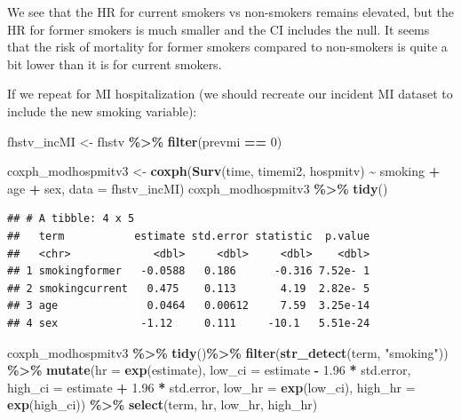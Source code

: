 \documentclass[
]{book}
\newenvironment{Shaded}{\begin{snugshade}}{\end{snugshade}}
\newcommand{\AttributeTok}[1]{\textcolor[rgb]{0.13,0.29,0.53}{#1}}
\newcommand{\DecValTok}[1]{\textcolor[rgb]{0.00,0.00,0.81}{#1}}
\newcommand{\FloatTok}[1]{\textcolor[rgb]{0.00,0.00,0.81}{#1}}
\newcommand{\FunctionTok}[1]{\textcolor[rgb]{0.13,0.29,0.53}{\textbf{#1}}}
\newcommand{\NormalTok}[1]{#1}
\newcommand{\OtherTok}[1]{\textcolor[rgb]{0.56,0.35,0.01}{#1}}
\newcommand{\SpecialCharTok}[1]{\textcolor[rgb]{0.81,0.36,0.00}{\textbf{#1}}}
\newcommand{\StringTok}[1]{\textcolor[rgb]{0.31,0.60,0.02}{#1}}
\begin{document}
We see that the HR for current smokers vs non-smokers remains elevated, but the HR for former smokers is much smaller and the CI includes the null. It seems that the risk of mortality for former smokers compared to non-smokers is quite a bit lower than it is for current smokers.

If we repeat for MI hospitalization (we should recreate our incident MI dataset to include the new smoking variable):

\begin{Shaded}
\begin{Highlighting}[]
\NormalTok{fhstv\_incMI }\OtherTok{\textless{}{-}}\NormalTok{ fhstv }\SpecialCharTok{\%\textgreater{}\%}
  \FunctionTok{filter}\NormalTok{(prevmi }\SpecialCharTok{==} \DecValTok{0}\NormalTok{) }

\NormalTok{coxph\_modhospmitv3 }\OtherTok{\textless{}{-}} \FunctionTok{coxph}\NormalTok{(}\FunctionTok{Surv}\NormalTok{(time, timemi2, hospmitv) }\SpecialCharTok{\textasciitilde{}} 
\NormalTok{                              smoking }\SpecialCharTok{+}\NormalTok{ age }\SpecialCharTok{+}\NormalTok{ sex, }
                            \AttributeTok{data =}\NormalTok{ fhstv\_incMI)}
\NormalTok{coxph\_modhospmitv3 }\SpecialCharTok{\%\textgreater{}\%}
  \FunctionTok{tidy}\NormalTok{()}
\end{Highlighting}
\end{Shaded}

\begin{verbatim}
## # A tibble: 4 x 5
##   term           estimate std.error statistic  p.value
##   <chr>             <dbl>     <dbl>     <dbl>    <dbl>
## 1 smokingformer   -0.0588   0.186      -0.316 7.52e- 1
## 2 smokingcurrent   0.475    0.113       4.19  2.82e- 5
## 3 age              0.0464   0.00612     7.59  3.25e-14
## 4 sex             -1.12     0.111     -10.1   5.51e-24
\end{verbatim}

\begin{Shaded}
\begin{Highlighting}[]
\NormalTok{coxph\_modhospmitv3 }\SpecialCharTok{\%\textgreater{}\%} 
  \FunctionTok{tidy}\NormalTok{()}\SpecialCharTok{\%\textgreater{}\%} 
  \FunctionTok{filter}\NormalTok{(}\FunctionTok{str\_detect}\NormalTok{(term, }\StringTok{"smoking"}\NormalTok{)) }\SpecialCharTok{\%\textgreater{}\%}
  \FunctionTok{mutate}\NormalTok{(}\AttributeTok{hr =} \FunctionTok{exp}\NormalTok{(estimate),}
         \AttributeTok{low\_ci =}\NormalTok{ estimate }\SpecialCharTok{{-}} \FloatTok{1.96} \SpecialCharTok{*}\NormalTok{ std.error, }
         \AttributeTok{high\_ci =}\NormalTok{ estimate }\SpecialCharTok{+} \FloatTok{1.96} \SpecialCharTok{*}\NormalTok{ std.error, }
         \AttributeTok{low\_hr =} \FunctionTok{exp}\NormalTok{(low\_ci), }
         \AttributeTok{high\_hr =} \FunctionTok{exp}\NormalTok{(high\_ci)) }\SpecialCharTok{\%\textgreater{}\%} 
  \FunctionTok{select}\NormalTok{(term, hr, low\_hr, high\_hr)}
\end{Highlighting}
\end{Shaded}
\end{document}
